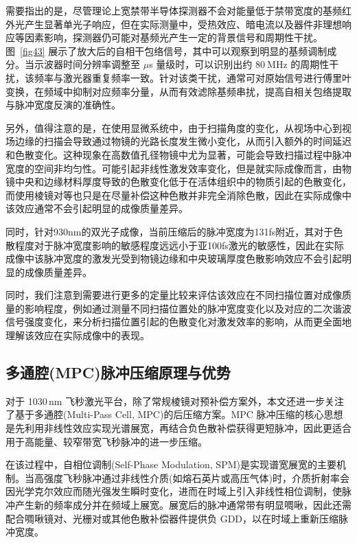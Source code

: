 需要指出的是，尽管理论上宽禁带半导体探测器不会对能量低于禁带宽度的基频红外光产生显著单光子响应，但在实际测量中，受热效应、暗电流以及器件非理想响应等因素影响，探测器仍可能对基频光产生一定的背景信号和周期性干扰。图~\ref{fig43} 展示了放大后的自相干包络信号，其中可以观察到明显的基频调制成分。当示波器时间分辨率调整至 $\mu$s 量级时，可以识别出约 $80~\mathrm{MHz}$ 的周期性干扰，该频率与激光器重复频率一致。针对该类干扰，通常可对原始信号进行傅里叶变换，在频域中抑制对应频率分量，从而有效滤除基频串扰，提高自相关包络提取与脉冲宽度反演的准确性。

另外，值得注意的是，在使用显微系统中，由于扫描角度的变化，从视场中心到视场边缘的扫描会导致通过物镜的光路长度发生微小变化，从而引入额外的时间延迟和色散变化。这种现象在高数值孔径物镜中尤为显著，可能会导致扫描过程中脉冲宽度的空间非均匀性。可能引起非线性激发效率变化，但是就实际成像而言，由物镜中央和边缘材料厚度导致的色散变化低于在活体组织中的物质引起的色散变化，而使用棱镜对等也只是在尽量补偿这种色散并非完全消除色散，因此在实际成像中该效应通常不会引起明显的成像质量差异。

同时，针对930nm的双光子成像，当前压缩后的脉冲宽度为131fs附近，其对于色散程度对于脉冲宽度影响的敏感程度远远小于亚100fs激光的敏感性，因此在实际成像中该脉冲宽度的激发光受到物镜边缘和中央玻璃厚度色散影响效应不会引起明显的成像质量差异。

同时，我们注意到需要进行更多的定量比较来评估该效应在不同扫描位置对成像质量的影响程度，例如通过测量不同扫描位置处的脉冲宽度变化以及对应的二次谐波信号强度变化，来分析扫描位置引起的色散变化对激发效率的影响，从而更全面地理解该效应在实际成像中的表现。



\subsection{多通腔(MPC)脉冲压缩原理与优势}\label{4.5.5}

对于 1030\,nm 飞秒激光平台，除了常规棱镜对预补偿方案外，本文还进一步关注了基于多通腔(Multi-Pass Cell, MPC)的后压缩方案。MPC 脉冲压缩的核心思想是先利用非线性效应实现光谱展宽，再结合负色散补偿获得更短脉冲，因此更适合用于高能量、较窄带宽飞秒脉冲的进一步压缩。

在该过程中，自相位调制(Self-Phase Modulation, SPM)是实现谱宽展宽的主要机制。当高强度飞秒脉冲通过非线性介质(如熔石英片或高压气体)时，介质折射率会因光学克尔效应而随光强发生瞬时变化，进而在时域上引入非线性相位调制，使脉冲产生新的频率成分并在频域上展宽。展宽后的脉冲通常带有明显啁啾，因此还需配合啁啾镜对、光栅对或其他色散补偿器件提供负 GDD，以在时域上重新压缩脉冲宽度。

